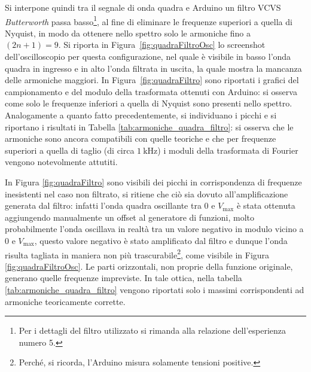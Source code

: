 \documentclass[10pt,oneside,a4paper]{article}
\begin{document}
\begin{multicols}{2}
Si interpone quindi tra il segnale di onda quadra e Arduino un filtro VCVS \emph{Butterworth} passa basso\footnote{Per i dettagli del filtro utilizzato si rimanda alla relazione dell'esperienza numero 5.}, al fine di eliminare le frequenze superiori a quella di Nyquist, in modo da ottenere nello spettro solo le armoniche fino a $(2n+1)=9$. Si riporta in Figura~\ref{fig:quadraFiltroOsc} lo screenshot dell'oscilloscopio per questa configurazione, nel quale è visibile in basso l'onda quadra in ingresso e in alto l'onda filtrata in uscita, la quale mostra la mancanza delle armoniche maggiori. In Figura~\ref{fig:quadraFiltro} sono riportati i grafici del campionamento e del modulo della trasformata ottenuti con Arduino: si osserva come solo le frequenze inferiori a quella di Nyquist sono presenti nello spettro.
Analogamente a quanto fatto precedentemente, si individuano i picchi e si riportano i risultati in Tabella \ref{tab:armoniche_quadra_filtro}: si osserva che le armoniche sono ancora compatibili con quelle teoriche e che per frequenze superiori a quella di taglio (di circa $\SI{1}{\kilo\hertz}$) i moduli della trasformata di Fourier vengono notevolmente attutiti.

In Figura \ref{fig:quadraFiltro} sono visibili dei picchi in corrispondenza di frequenze inesistenti nel caso non filtrato, si ritiene che ciò sia dovuto all'amplificazione generata dal filtro: infatti l'onda quadra oscillante tra $0$ e $V_\text{max}$ è stata ottenuta aggiungendo manualmente un offset al generatore di funzioni, molto probabilmente l'onda oscillava in realtà tra un valore negativo in modulo vicino a $0$ e $V_\text{max}$, questo valore negativo è stato amplificato dal filtro e dunque l'onda risulta tagliata in maniera non più trascurabile\footnote{Perché, si ricorda, l'Arduino misura solamente tensioni positive.}, come visibile in Figura \ref{fig:quadraFiltroOsc}. Le parti orizzontali, non proprie della funzione originale, generano quelle frequenze impreviste. In tale ottica, nella tabella \ref{tab:armoniche_quadra_filtro} vengono riportati solo i massimi corrispondenti ad armoniche teoricamente corrette.


\end{multicols}
\end{document}
